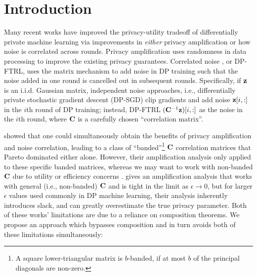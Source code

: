 \section{Introduction}

Many recent works have improved the privacy-utility tradeoff of differentially private machine learning via improvements in \textit{either} privacy amplification or how noise is correlated across rounds. Privacy amplification \citep{KLNRS,balle2018improving, PAS, balle2020privacy} uses randomness in data processing to improve the existing privacy guarantees. Correlated noise \citep{kairouz2021practical, denisov2022improved, choquette2022multi}, or DP-FTRL, uses the matrix mechanism to add noise in DP training such that the noise added in one round is cancelled out in subsequent rounds. Specifically, if $\mathbf{z}$ is an i.i.d. Gaussian matrix, independent noise approaches, i.e.,  differentially private stochastic gradient descent (DP-SGD) clip gradients and add noise $\mathbf{z}[i, :]$ in the $i$th round of DP training; instead, DP-FTRL $(\mathbf{C}^{-1} \mathbf{z})[i, :]$ as the noise in the $i$th round, where $\mathbf{C}$ is a carefully chosen ``correlation matrix''. 

\citet{choquette2024amplified} showed that one could simultaneously obtain the benefits of privacy amplification and noise correlation, leading to a class of ``banded''\footnote{A square lower-triangular matrix is $b$-banded, if at most $b$ of the principal diagonals are non-zero.} $\mathbf{C}$ correlation matrices that Pareto dominated either alone.
However, their amplification analysis only applied to these specific banded matrices, whereas we may want to work with non-banded $\mathbf{C}$ due to utility or efficiency concerns \citep{dvijotham2024efficientnearoptimalnoisegeneration, mcmahan2024hasslefreealgorithmprivatelearning}. \citet{choquettechoo2024privacy} gives an amplification analysis that works with general (i.e., non-banded) $\mathbf{C}$ and is tight in the limit as $\epsilon \rightarrow 0$, but for larger $\epsilon$ values used commonly in DP machine learning, their analysis inherently introduces slack, and can greatly overestimate the true privacy parameter. Both of these works' limitations are due to a reliance on composition theorems. We propose an approach which bypasses composition and in turn avoids both of these limitations simultaneously:

